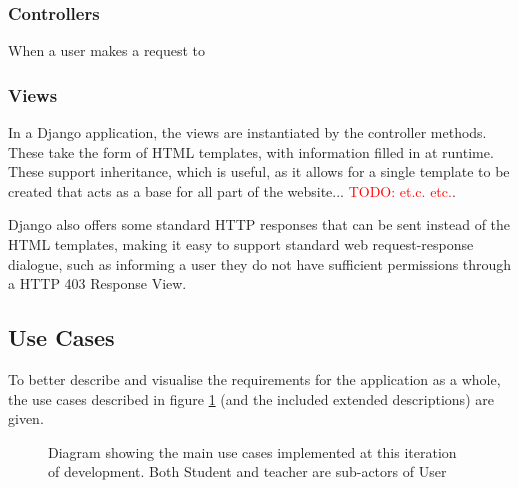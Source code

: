 \documentclass[a4paper,11pt]{report}
\newcommand{\todo}[1]{\textcolor{red}{TODO: #1}}
\begin{document}
\subsubsection{Controllers}
When a user makes a request to 


\subsubsection{Views}
In a Django application, the views are instantiated by the controller methods. These take the form of HTML templates, with information filled in at runtime. These support inheritance, which is useful, as it allows for a single template to be created that acts as a base for all part of the website... \todo{et.c. etc.}.\par
Django also offers some standard HTTP responses that can be sent instead of the HTML templates, making it easy to support standard web request-response dialogue, such as informing a user they do not have sufficient permissions through a HTTP 403 Response View.

\subsection{Use Cases}
To better describe and visualise the requirements for the application as a whole, the use cases described in figure \ref{fig:uc} (and the included extended descriptions) are given.
\begin{figure}[ht]
\centering
{}
\label{fig:uc}
\caption{Diagram showing the main use cases implemented at this iteration of development. Both Student and teacher are sub-actors of User}
\end{figure}
\end{document}

